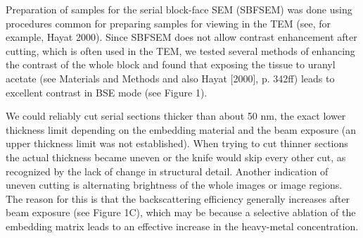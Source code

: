\documentclass{article}
\begin{document}
Preparation of samples for the serial block-face SEM (SBFSEM) was done using procedures common for preparing samples for viewing in the TEM (see, for example, Hayat 2000). Since SBFSEM does not allow contrast enhancement after cutting, which is often used in the TEM, we tested several methods of enhancing the contrast of the whole block and found that exposing the tissue to uranyl acetate (see Materials and Methods and also Hayat [2000], p. 342ff) leads to excellent contrast in BSE mode (see Figure 1).

We could reliably cut serial sections thicker than about 50 nm, the exact lower thickness limit depending on the embedding material and the beam exposure (an upper thickness limit was not established). When trying to cut thinner sections the actual thickness became uneven or the knife would skip every other cut, as recognized by the lack of change in structural detail. Another indication of uneven cutting is alternating brightness of the whole images or image regions. The reason for this is that the backscattering efficiency generally increases after beam exposure (see Figure 1C), which may be because a selective ablation of the embedding matrix leads to an effective increase in the heavy-metal concentration.
\end{document}
